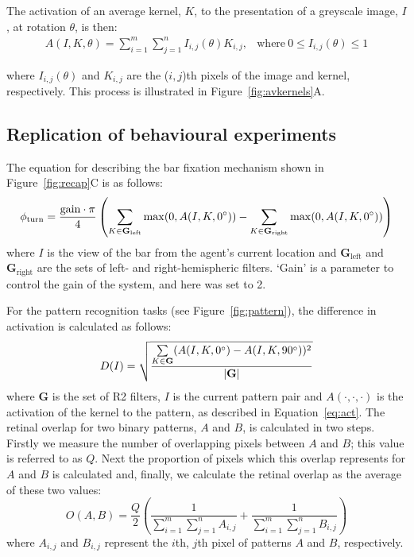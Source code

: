 \documentclass[10pt]{article}
\begin{document}
The activation of an average kernel, $K$, to the presentation of a greyscale image, $I$, at rotation $\theta$, is then:
\begin{equation}
\label{eq:act}
\begin{array}{rl}
A(I,K,\theta) = {\sum\limits^m_{i=1} \sum\limits^n_{j=1} I_{i,j}(\theta)K_{i,j}}, &\mathrm{where\ } 0 \le I_{i,j}(\theta) \le 1
\end{array}
\end{equation}

where $I_{i,j}(\theta)$ and $K_{i,j}$ are the ($i,j$)th pixels of the image and kernel, respectively. This process is illustrated in Figure~\ref{fig:avkernels}A.

\subsection*{Replication of behavioural experiments}
\label{sec:methods:replication}
The equation for describing the bar fixation mechanism shown in Figure~\ref{fig:recap}C is as follows:
$$
\phi_\mathrm{turn} = \frac{\mathrm{gain}\cdot \pi}{4}\left( \sum\limits_{K\in \mathbf{G}_\mathrm{left}}\max(0,A(I,K,0\degree)) - \sum\limits_{K\in \mathbf{G}_\mathrm{right}}\max(0,A(I,K,0\degree)) \right)
$$
where $I$ is the view of the bar from the agent's current location and $\mathbf{G}_\mathrm{left}$ and $\mathbf{G}_\mathrm{right}$ are the sets of left- and right-hemispheric filters. `Gain' is a parameter to control the gain of the system, and here was set to 2.

For the pattern recognition tasks (see Figure~\ref{fig:pattern}), the difference in activation is calculated as follows:
$$
D(I) = \sqrt{\frac{\sum\limits_{K\in \mathbf{G}}(A(I,K,0\degree)-A(I,K,90\degree))^2}{|\mathbf{G}|}}
$$
where $\mathbf{G}$ is the set of R2 filters, $I$ is the current pattern pair and $A(\cdot,\cdot,\cdot)$ is the activation of the kernel to the pattern, as described in Equation~\ref{eq:act}.
The retinal overlap for two binary patterns, $A$ and $B$, is calculated in two steps. Firstly we measure the number of overlapping pixels between $A$ and $B$; this value is referred to as $Q$. Next the proportion of pixels which this overlap represents for $A$ and $B$ is calculated and, finally, we calculate the retinal overlap as the average of these two values:
$$
O(A,B) = \frac{Q}{2} \left( \frac{1}{\sum\limits_{i=1}^m \sum\limits_{j=1}^n A_{i,j}} + \frac{1}{\sum\limits_{i=1}^m \sum\limits_{j=1}^n B_{i,j}} \right)
$$
where $A_{i,j}$ and $B_{i,j}$ represent the $i$th, $j$th pixel of patterns $A$ and $B$, respectively.
\end{document}
